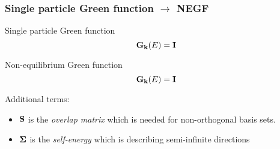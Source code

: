 \begin{frame}
  \frametitle{Single particle Green function $\to$ NEGF}

  \begin{block}{Single particle Green function}
    \begin{equation*}
      [(E+\im\eta)\ID - \HH_\kk]\G_\kk(E) = \ID
    \end{equation*}
  \end{block}

  \begin{block}{Non-equilibrium Green function}
    \begin{equation*}
      [(E+\im\eta)\SO - \HH_\kk - \sum_\idxE \SE_{\idxE,\kk}(E-\mu_\idxE)]\G_\kk(E) = \ID
    \end{equation*}

    Additional terms:
    \begin{itemize}
      \item%
      $\mathbf{S}$ is the \emph{overlap matrix} which is needed for non-orthogonal basis sets.

      \item%
      $\boldsymbol{\Sigma}$ is the \emph{self-energy} which is describing semi-infinite directions

    \begin{center}
      
      \begin{columns}

\end{columns}
\end{center}
\end{itemize}
\end{block}
\end{frame}
